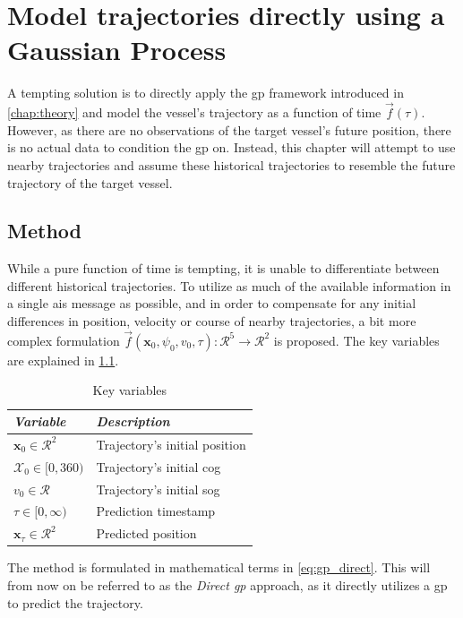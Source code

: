 \chapter{Model trajectories directly using a Gaussian Process}\label{chap:direct_gp}
 A tempting solution is to directly apply the \acrshort{gp} framework introduced in \cref{chap:theory} and model the vessel's trajectory as a function of time $\vec{f}(\tau)$. However, as there are no observations of the target vessel's future position, there is no actual data to condition the \acrshort{gp} on. Instead, this chapter will attempt to use nearby trajectories and assume these historical trajectories to resemble the future trajectory of the target vessel. 

\section{Method}
While a pure function of time is tempting, it is unable to differentiate between different historical trajectories. To utilize as much of the available information in a single \acrshort{ais} message as possible, and in order to compensate for any initial differences in position, velocity or course of nearby trajectories, a bit more complex formulation $\vec{f}(\boldsymbol{x}_0, \psi_0, v_0, \tau): \mathcal{R}^5 \to \mathcal{R}^2$ is proposed. The key variables are explained in \cref{table:posgp_key_variables}.

\begin{table}[h]
    \centering
    \begin{tabular}{ll}
        \textit{\textbf{Variable}}              & \textit{\textbf{Description}}      \\ \hline
        $\boldsymbol{x}_0 \in \mathcal{R}^2$    & Trajectory's initial position       \\
        $\mathcal{X}_0 \in [0, 360)$            & Trajectory's initial \acrshort{cog} \\
        $v_0 \in \mathcal{R}$                   & Trajectory's initial \acrshort{sog} \\
        $\tau \in [0, \infty)$                  & Prediction timestamp               \\
        $\boldsymbol{x}_\tau \in \mathcal{R}^2$ & Predicted position                 \\
    \end{tabular}
    \caption{Key variables}
    \label{table:posgp_key_variables}
\end{table}
The method is formulated in mathematical terms in \cref{eq:gp_direct}. This will from now on be referred to as the \textit{Direct \acrshort{gp}} approach, as it directly utilizes a \acrshort{gp} to predict the trajectory.

